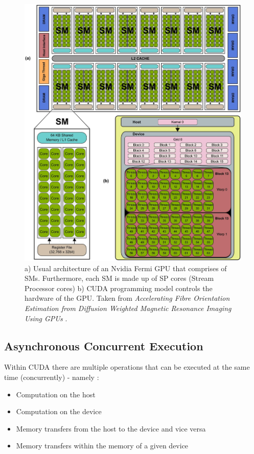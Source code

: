 \begin{figure}[h!]
	\centering
	\includegraphics[width=\textwidth, keepaspectratio]{images/ch1/nvidia_gpu_sms_cuda.png}
	\caption{a) Usual architecture of an Nvidia Fermi GPU that comprises of SMs. Furthermore, each SM is made up of SP cores (Stream Processor cores) b) CUDA programming model controls the hardware of the GPU. Taken from \emph{Accelerating Fibre Orientation Estimation from Diffusion Weighted Magnetic Resonance Imaging Using GPUs} \cite{Hernandez2013429}.}
	\label{Figure:Nvidia-GPU-structure-CUDA-thread-structure}
\end{figure}

\subsection{Asynchronous Concurrent Execution}\label{Subsection:CUDA-asynchronous-concurrent-execution}
Within CUDA there are multiple operations that can be executed at the same time (concurrently) - namely \cite{NVIDIAMay2022}:
\begin{itemize}
	\item Computation on the host
	\item Computation on the device
	\item Memory transfers from the host to the device and vice versa
	\item Memory transfers within the memory of a given device
\end{itemize}

